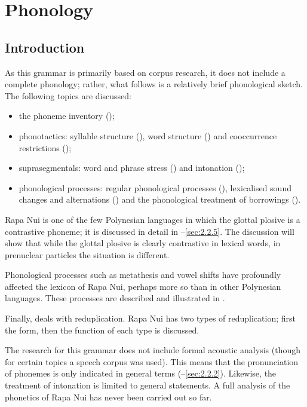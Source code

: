 \chapter{Phonology}\label{ch:2}
\section{Introduction}\label{sec:2.1}

As this grammar is primarily based on corpus research, it does not include a complete phonology; rather, what follows is a relatively brief phonological sketch. The following topics are discussed: 

\begin{itemize}
\item 
the phoneme inventory ();

\item 
phonotactics: syllable structure (), word structure () and cooccurrence restrictions ();

\item 
suprasegmentals: word and phrase stress () and intonation ();

\item 
phonological processes: regular phonological processes (), lexicalised sound changes and alternations () and the phonological treatment of borrowings ().

\end{itemize}

Rapa Nui is one of the few Polynesian languages in which the glottal plosive is a contrastive phoneme; it is discussed in detail in –\ref{sec:2.2.5}. The discussion will show that while the glottal plosive is clearly contrastive in lexical words, in prenuclear particles the situation is different.

Phonological processes such as metathesis and vowel shifts have profoundly affected the lexicon of Rapa Nui, perhaps more so than in other Polynesian languages. These processes are described and illustrated in .

Finally,  deals with reduplication. Rapa Nui has two types of reduplication; first the form, then the function of each type is discussed.

The research for this grammar does not include formal acoustic analysis (though for certain topics a speech corpus was used). This means that the pronunciation of phonemes is only indicated in general terms (–\ref{sec:2.2.2}). Likewise, the treatment of intonation is limited to general statements. A full analysis of the phonetics of Rapa Nui has never been carried out so far.

